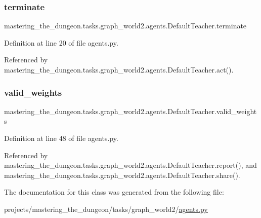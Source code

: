 \subsubsection{\texorpdfstring{terminate}{terminate}}
{\footnotesize\ttfamily mastering\+\_\+the\+\_\+dungeon.\+tasks.\+graph\+\_\+world2.\+agents.\+Default\+Teacher.\+terminate}



Definition at line 20 of file agents.\+py.



Referenced by mastering\+\_\+the\+\_\+dungeon.\+tasks.\+graph\+\_\+world2.\+agents.\+Default\+Teacher.\+act().

\mbox{\label{classmastering__the__dungeon_1_1tasks_1_1graph__world2_1_1agents_1_1DefaultTeacher_a1f5119fc299aacb422869eb05775cc6f}} 
\subsubsection{\texorpdfstring{valid\+\_\+weights}{valid\_weights}}
{\footnotesize\ttfamily mastering\+\_\+the\+\_\+dungeon.\+tasks.\+graph\+\_\+world2.\+agents.\+Default\+Teacher.\+valid\+\_\+weights}



Definition at line 48 of file agents.\+py.



Referenced by mastering\+\_\+the\+\_\+dungeon.\+tasks.\+graph\+\_\+world2.\+agents.\+Default\+Teacher.\+report(), and mastering\+\_\+the\+\_\+dungeon.\+tasks.\+graph\+\_\+world2.\+agents.\+Default\+Teacher.\+share().



The documentation for this class was generated from the following file\+:\begin{DoxyCompactItemize}
\item 
projects/mastering\+\_\+the\+\_\+dungeon/tasks/graph\+\_\+world2/\hyperlink{projects_2mastering__the__dungeon_2tasks_2graph__world2_2agents_8py}{agents.\+py}\end{DoxyCompactItemize}
